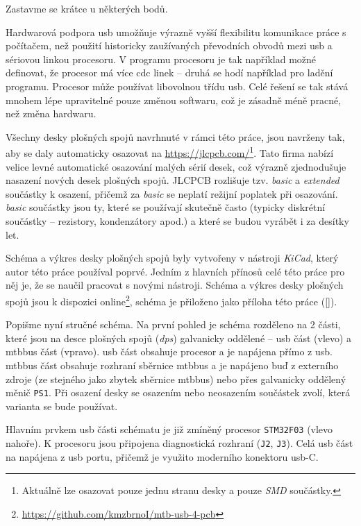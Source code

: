Zastavme se krátce u některých bodů.

Hardwarová podpora \gls{usb} umožňuje výrazně vyšší flexibilitu komunikace
práce s počítačem, než použití historicky zaužívaných převodních obvodů mezi
\gls{usb} a sériovou linkou procesoru. V programu procesoru je tak například
možné definovat, že procesor má více \gls{cdc} linek – druhá se hodí například
pro ladění programu. Procesor může používat libovolnou třídu \gls{usb}. Celé
řešení se tak stává mnohem lépe upravitelné pouze změnou softwaru, což je
zásadně méně pracné, než změna hardwaru.

Všechny desky plošných spojů navrhnuté v rámci této práce, jsou navrženy tak,
aby se daly automaticky osazovat na \url{https://jlcpcb.com/}\footnote{Aktuálně
lze osazovat pouze jednu stranu desky a pouze \textit{SMD} součástky.}. Tato
firma nabízí velice levné automatické osazování malých sérií desek, což výrazně
zjednodušuje nasazení nových desek plošných spojů. JLCPCB rozlišuje tzv.
\textit{basic} a \textit{extended} součástky k osazení, přičemž za
\textit{basic} se neplatí režijní poplatek při osazování. \textit{basic}
součástky jsou ty, které se používají skutečně často (typicky diskrétní
součástky – rezistory, kondenzátory apod.) a které se budou vyrábět i za
desítky let.

Schéma a výkres desky plošných spojů byly vytvořeny v nástroji \textit{KiCad},
který autor této práce používal poprvé. Jedním z hlavních přínosů celé této
práce pro něj je, že se naučil pracovat s novými nástroji. Schéma a výkres
desky plošných spojů jsou k dispozici
online\footnote{\url{https://github.com/kmzbrnoI/mtb-usb-4-pcb}}, schéma je
přiloženo jako příloha této práce (\ref{}).

Popišme nyní stručné schéma. Na první pohled je schéma rozděleno na 2 části,
které jsou na desce plošných spojů (\textit{\gls{dps}}) galvanicky oddělené –
\gls{usb} část (vlevo) a \gls{mtbbus} část (vpravo). \gls{usb} část obsahuje
procesor a je napájena přímo z \gls{usb}. \gls{mtbbus} část obsahuje rozhraní
sběrnice \gls{mtbbus} a je napájeno buď z externího zdroje (ze stejného jako
zbytek sběrnice \gls{mtbbus}) nebo přes galvanicky oddělený měnič \texttt{PS1}.
Při osazení desky se osazením nebo neosazením součástek zvolí, která varianta
se bude používat.

Hlavním prvkem \gls{usb} části schématu je již zmíněný procesor
\texttt{STM32F03} (vlevo nahoře). K procesoru jsou připojena diagnostická
rozhraní (\texttt{J2}, \texttt{J3}). Celá \gls{usb} část na napájena z \gls{usb}
portu, přičemž je využito moderního konektoru \gls{usb}-C.

